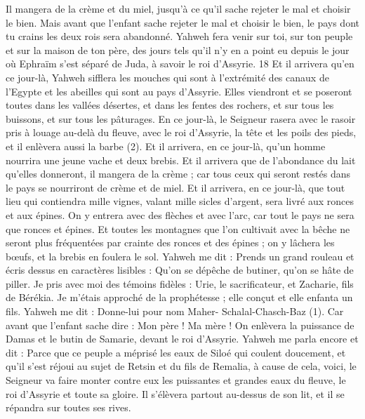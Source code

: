 \begin{multicols}{2}
Il mangera de la crème et du miel, jusqu’à ce qu'il sache rejeter le mal et choisir le bien.
Mais avant que l'enfant sache rejeter le mal et choisir le bien, le pays dont tu crains les deux rois sera abandonné.
Yahweh fera venir sur toi, sur ton peuple et sur la maison de ton père, des jours tels qu’il n’y en a point eu depuis le jour où Ephraïm s’est séparé de Juda, à savoir le roi d'Assyrie. 18 Et il arrivera qu'en ce jour-là, Yahweh sifflera les mouches qui sont à l’extrémité des canaux de l'Egypte et les abeilles qui sont au pays d'Assyrie.
Elles viendront et se poseront toutes dans les vallées désertes, et dans les fentes des rochers, et sur tous les buissons, et sur tous les pâturages.
En ce jour-là, le Seigneur rasera avec le rasoir pris à louage au-delà du fleuve, avec le roi d'Assyrie, la tête et les poils des pieds, et il enlèvera aussi la barbe (2).
Et il arrivera, en ce jour-là, qu'un homme nourrira une jeune vache et deux brebis.
Et il arrivera que de l'abondance du lait qu'elles donneront, il mangera de la crème ; car tous ceux qui seront restés dans le pays se nourriront de crème et de miel.
Et il arrivera, en ce jour-là, que tout lieu qui contiendra mille vignes, valant mille sicles d'argent, sera livré aux ronces et aux épines.
On y entrera avec des flèches et avec l'arc, car tout le pays ne sera que ronces et épines.
Et toutes les montagnes que l’on cultivait avec la bêche ne seront plus fréquentées par crainte des ronces et des épines ; on y lâchera les bœufs, et la brebis en foulera le sol.
\VerseOne{}Yahweh me dit : Prends un grand rouleau et écris dessus en caractères lisibles : Qu’on se dépêche de butiner, qu’on se hâte de piller.
Je pris avec moi des témoins fidèles : Urie, le sacrificateur, et Zacharie, fils de Bérékia.
Je m’étais approché de la prophétesse ; elle conçut et elle enfanta un fils. Yahweh me dit : Donne-lui pour nom Maher- Schalal-Chasch-Baz (1).
Car avant que l'enfant sache dire : Mon père ! Ma mère ! On enlèvera la puissance de Damas et le butin de Samarie, devant le roi d'Assyrie.
Yahweh me parla encore et dit :
Parce que ce peuple a méprisé les eaux de Siloé qui coulent doucement, et qu'il s'est réjoui au sujet de Retsin et du fils de Remalia,
à cause de cela, voici, le Seigneur va faire monter contre eux les puissantes et grandes eaux du fleuve, le roi d'Assyrie et toute sa gloire. Il s’élèvera partout au-dessus de son lit, et il se répandra sur toutes ses rives.

\end{multicols}
